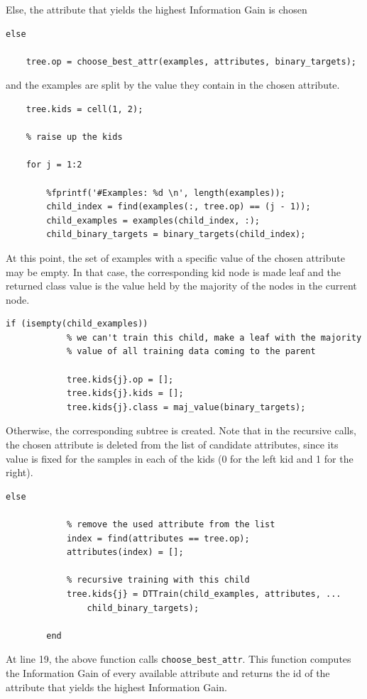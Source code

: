 \documentclass{article}
\begin{document}
Else, the attribute that yields the highest Information Gain is chosen
\begin{lstlisting}[firstnumber=17]
else
    
    tree.op = choose_best_attr(examples, attributes, binary_targets);
\end{lstlisting}
and the examples are split by the value they contain in the chosen attribute.
\begin{lstlisting}
    tree.kids = cell(1, 2);
        
    % raise up the kids
    
    for j = 1:2
        
        %fprintf('#Examples: %d \n', length(examples));
        child_index = find(examples(:, tree.op) == (j - 1));
        child_examples = examples(child_index, :);     
        child_binary_targets = binary_targets(child_index);
\end{lstlisting}
At this point, the set of examples with a specific value of the chosen attribute may be empty. In that case, the corresponding kid node is made leaf and the returned class value is the value held by the majority of the nodes in the current node.
\begin{lstlisting}[firstnumber=36]
        if (isempty(child_examples))
            % we can't train this child, make a leaf with the majority
            % value of all training data coming to the parent
            
            tree.kids{j}.op = [];
            tree.kids{j}.kids = [];
            tree.kids{j}.class = maj_value(binary_targets);
\end{lstlisting}
Otherwise, the corresponding subtree is created. Note that in the recursive calls, the chosen attribute is deleted from the list of candidate attributes, since its value is fixed for the samples in each of the kids (0 for the left kid and 1 for the right).
\begin{lstlisting}[firstnumber=44]
        else 
            
            % remove the used attribute from the list
            index = find(attributes == tree.op);
            attributes(index) = [];
            
            % recursive training with this child
            tree.kids{j} = DTTrain(child_examples, attributes, ...
                child_binary_targets);
                    
        end
\end{lstlisting}
At line 19, the above function calls \verb$choose_best_attr$. This function computes the Information Gain of every available attribute and returns the id of the attribute that yields the highest Information Gain.
\end{document}

